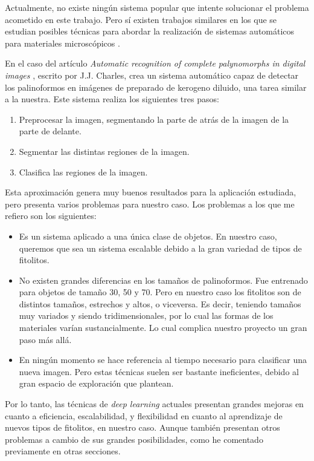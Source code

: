 

Actualmente, no existe ningún sistema popular que intente solucionar el problema acometido en este trabajo. Pero sí existen trabajos similares en los que se estudian posibles técnicas para abordar la realización de sistemas automáticos para materiales microscópicos \cite{palyrecog}.

En el caso del artículo \textit{Automatic recognition of complete palynomorphs in digital images} \cite{palyrecog}, escrito por J.J. Charles, crea un sistema automático capaz de detectar los palinoformos en imágenes de preparado de kerogeno diluido, una tarea similar a la nuestra. Este sistema realiza los siguientes tres pasos:

\begin{enumerate}
	\item Preprocesar la imagen, segmentando la parte de atrás de la imagen de la parte de delante.
	\item Segmentar las distintas regiones de la imagen.
	\item Clasifica las regiones de la imagen.
\end{enumerate}

Esta aproximación genera muy buenos resultados para la aplicación estudiada, pero presenta varios problemas para nuestro caso. Los problemas a los que me refiero son los siguientes:

\begin{itemize}
	\item Es un sistema aplicado a una única clase de objetos. En nuestro caso, queremos que sea un sistema escalable debido a la gran variedad de tipos de fitolitos.
	\item No existen grandes diferencias en los tamaños de palinoformos. Fue entrenado para objetos de tamaño 30, 50 y 70. Pero en nuestro caso los fitolitos son de distintos tamaños, estrechos y altos, o viceversa. Es decir, teniendo tamaños muy variados y siendo tridimensionales, por lo cual las formas de los materiales varían sustancialmente. Lo cual complica nuestro proyecto un gran paso más allá.
	\item En ningún momento se hace referencia al tiempo necesario para clasificar una nueva imagen. Pero estas técnicas suelen ser bastante ineficientes, debido al gran espacio de exploración que plantean.
\end{itemize}

Por lo tanto, las técnicas de \textit{deep learning} actuales presentan grandes mejoras en cuanto a eficiencia, escalabilidad, y flexibilidad en cuanto al aprendizaje de nuevos tipos de fitolitos, en nuestro caso. Aunque también presentan otros problemas a cambio de sus grandes posibilidades, como he comentado previamente en otras secciones.